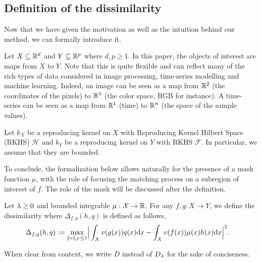 \subsection{Definition of the dissimilarity}
Now that we have given the motivation as well as the intuition behind our method, we can formally introduce it.


Let $X \subseteq \mathbb R^d$ and $Y \subseteq \mathbb R^p$ where $d, p \geq 1$. In this paper, the objects of interest are maps from $X$ to $Y$. Note that this is quite flexible and can reflect many of the rich types of data considered in image processing, time-series modelling and machine learning. Indeed, an image can be seen as a map from $\mathbb R^2$ (the coordinates of the pixels) to $\mathbb R^3$ (the color space, RGB for instance). A time-series can be seen as a map from $\mathbb R^1$ (time) to $\mathbb R^n$ (the space of the sample values).

Let $k_X$ be a reproducing kernel on $X$ with Reproducing Kernel Hilbert Space (RKHS) $\mathcal H$  \cite{aronszajn1950theory} and $k_Y$ be a reproducing kernel on $Y$ with RKHS $\mathcal F$. In particular, we assume that they are bounded.


To conclude, the formalization below allows naturally for the presence of a mask function $\mu$, with the role of focusing the matching process on a subregion of interest of $f$. The role of the mask will be discussed after the definition.


\begin{definition}\label{def:D}
    Let $\lambda \geq 0$ and bounded integrable $\mu:{\cal X} \to \mathbb R$.  For any $f,g:X\to Y$, we define the dissimilarity
where $\Delta_{f, g}(h, q)$ is defined as follows,
\begin{align*}
\Delta_{f, g}(h, q) := \max_{\|v\|_{{\cal F}} \leq 1} &\Big|  \int_X v(g(x))q(x)\mathrm{d} x-  \int_X v(f(x))\mu(x)h(x)\mathrm{d} x\Big|^2.
\end{align*}
\end{definition}

\noindent When clear from context, we write $D$ instead of $D_\lambda$ for the sake of conciseness.

